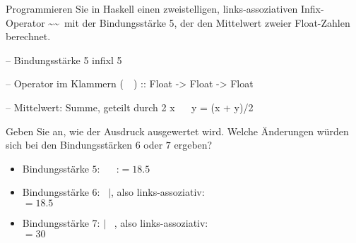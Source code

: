 \begin{frame}[fragile]
    \begin{exercise}[a) + b)]
        Programmieren Sie in Haskell einen zweistelligen, links-assoziativen Infix-Operator \textasciitilde\textasciitilde~mit der Bindungsstärke 5, der den Mittelwert zweier Float-Zahlen berechnet.
    \end{exercise}
    \begin{solve}[a) + b)]
    \begin{plainhaskell}
-- Bindungsstärke 5
infixl 5 ~~

-- Operator im Klammern
(~~) :: Float -> Float -> Float

-- Mittelwert: Summe, geteilt durch 2
x ~~ y = (x + y)/2
    \end{plainhaskell}
    \end{solve}
\end{frame}
\addtocounter{exercise}{-1}\addtocounter{solve}{-1}%
\begin{frame}
    \begin{exercise}[c)]
        Geben Sie an, wie der Ausdruck  ausgewertet wird. Welche Änderungen würden sich bei den Bindungsstärken $6$ oder $7$ ergeben?
    \end{exercise}
    \begin{solve}[c)]
    \begin{itemize}
        \item Bindungsstärke $5$: \bhaskell{*} \faAngleRight~\bhaskell{+} \faAngleRight{}~\bhaskell{\~~}:\hfill{}$= 18.5$
        \item Bindungsstärke $6$: \bhaskell{*} \faAngleRight~\bhaskell{+}$\mid$\bhaskell{\~~}, also links-assoziativ:\\\hfill{}$=18.5$
        \item Bindungsstärke $7$: \bhaskell{*}$\mid$\bhaskell{\~~} \faAngleRight~\bhaskell{+}, also links-assoziativ:\\\hfill{}$=30$
    \end{itemize}
    \end{solve}
\end{frame}